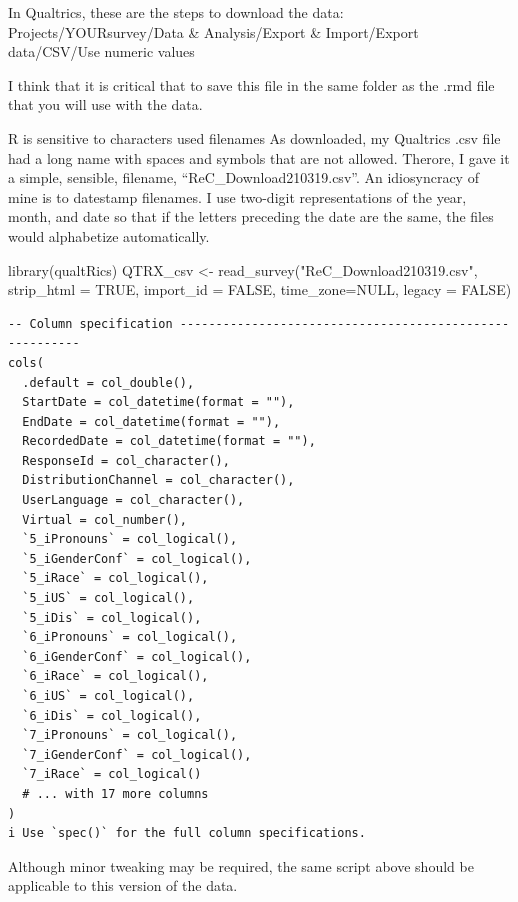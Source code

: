 \documentclass[
  english,
]{book}
\newenvironment{Shaded}{\begin{snugshade}}{\end{snugshade}}
\newcommand{\AttributeTok}[1]{\textcolor[rgb]{0.77,0.63,0.00}{#1}}
\newcommand{\ConstantTok}[1]{\textcolor[rgb]{0.00,0.00,0.00}{#1}}
\newcommand{\FunctionTok}[1]{\textcolor[rgb]{0.00,0.00,0.00}{#1}}
\newcommand{\NormalTok}[1]{#1}
\newcommand{\OtherTok}[1]{\textcolor[rgb]{0.56,0.35,0.01}{#1}}
\newcommand{\StringTok}[1]{\textcolor[rgb]{0.31,0.60,0.02}{#1}}
\begin{document}
In Qualtrics, these are the steps to download the data: Projects/YOURsurvey/Data \& Analysis/Export \& Import/Export data/CSV/Use numeric values

I think that it is critical that to save this file in the same folder as the .rmd file that you will use with the data.

R is sensitive to characters used filenames As downloaded, my Qualtrics .csv file had a long name with spaces and symbols that are not allowed. Therore, I gave it a simple, sensible, filename, ``ReC\_Download210319.csv''. An idiosyncracy of mine is to datestamp filenames. I use two-digit representations of the year, month, and date so that if the letters preceding the date are the same, the files would alphabetize automatically.

\begin{Shaded}
\begin{Highlighting}[]
\FunctionTok{library}\NormalTok{(qualtRics)}
\NormalTok{QTRX\_csv }\OtherTok{\textless{}{-}} \FunctionTok{read\_survey}\NormalTok{(}\StringTok{"ReC\_Download210319.csv"}\NormalTok{, }\AttributeTok{strip\_html =} \ConstantTok{TRUE}\NormalTok{, }\AttributeTok{import\_id =} \ConstantTok{FALSE}\NormalTok{, }\AttributeTok{time\_zone=}\ConstantTok{NULL}\NormalTok{, }\AttributeTok{legacy =} \ConstantTok{FALSE}\NormalTok{)}
\end{Highlighting}
\end{Shaded}

\begin{verbatim}
-- Column specification --------------------------------------------------------
cols(
  .default = col_double(),
  StartDate = col_datetime(format = ""),
  EndDate = col_datetime(format = ""),
  RecordedDate = col_datetime(format = ""),
  ResponseId = col_character(),
  DistributionChannel = col_character(),
  UserLanguage = col_character(),
  Virtual = col_number(),
  `5_iPronouns` = col_logical(),
  `5_iGenderConf` = col_logical(),
  `5_iRace` = col_logical(),
  `5_iUS` = col_logical(),
  `5_iDis` = col_logical(),
  `6_iPronouns` = col_logical(),
  `6_iGenderConf` = col_logical(),
  `6_iRace` = col_logical(),
  `6_iUS` = col_logical(),
  `6_iDis` = col_logical(),
  `7_iPronouns` = col_logical(),
  `7_iGenderConf` = col_logical(),
  `7_iRace` = col_logical()
  # ... with 17 more columns
)
i Use `spec()` for the full column specifications.
\end{verbatim}

Although minor tweaking may be required, the same script above should be applicable to this version of the data.
\end{document}
